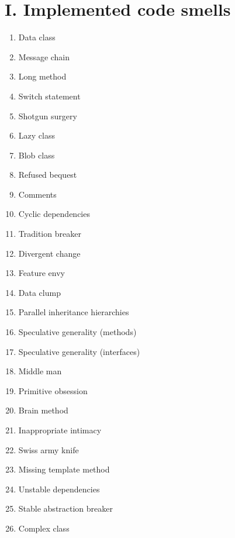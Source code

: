 \documentclass[12pt]{article}
\begin{document}
    \section*{I. Implemented code smells}
    \label{appendix:implemented-code-smells}

    \begin{enumerate}
        \item Data class
        \item Message chain
        \item Long method
        \item Switch statement
        \item Shotgun surgery
        \item Lazy class
        \item Blob class
        \item Refused bequest
        \item Comments
        \item Cyclic dependencies
        \item Tradition breaker
        \item Divergent change
        \item Feature envy
        \item Data clump
        \item Parallel inheritance hierarchies
        \item Speculative generality (methods)
        \item Speculative generality (interfaces)
        \item Middle man
        \item Primitive obsession
        \item Brain method
        \item Inappropriate intimacy
        \item Swiss army knife
        \item Missing template method
        \item Unstable dependencies
        \item Stable abstraction breaker
        \item Complex class
    \end{enumerate}

    \newpage
\end{document}
